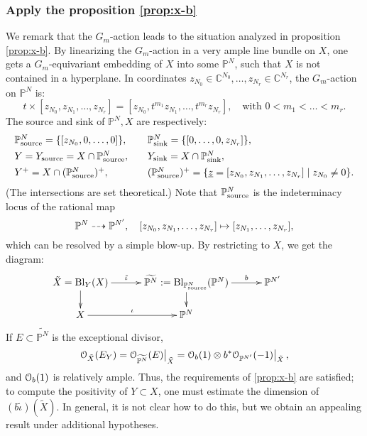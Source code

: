 \documentclass[11pt,reqno]{amsart}
\let\mt\mapsto
\let\euf\EuScript
\let\mbb\mathbb
\let\unl\underline
\let\tld\tilde
\let\wtld\widetilde
\numberwithin{equation}{section}
\numberwithin{figure}{section}
\begin{document}
\subsubsection{Apply the proposition \ref{prop:x-b}}\label{sssct:x-b}
We remark that the $G_m$-action leads to the situation analyzed 
in proposition \ref{prop:x-b}. By linearizing the $G_m$-action in a very ample 
line bundle on $X$, one gets a $G_m$-equivariant embedding of $X$ into some 
$\mbb P^N$, such that $X$ is not contained in a hyperplane. 
In coordinates $z_{N_0}\in{{\mbb C}}^{N_0},\ldots,z_{N_r}\in{{\mbb C}}^{N_r}$, 
the $G_m$-action on $\mbb P^N$ is: 
\begin{equation}\label{eq:c*}
t\times[z_{N_0},z_{N_1},\ldots,z_{N_r}]=
[z_{N_0},t^{m_1}z_{N_1},\ldots,t^{m_r}z_{N_r}],
\quad\text{with }0<m_1<\ldots<m_r. 
\end{equation}
The source and sink of $\mbb P^N, X$ are respectively: 
\begin{equation}\label{eq:YP}
\begin{array}{lcll}
\mbb P^N_{\rm source}=\{[z_{N_0},0,\ldots,0]\}, 
&&
\mbb P^N_{\rm sink}=\{[0,\ldots,0,z_{N_r}]\},
\\[1ex] 
Y=Y_{\rm source}=X\cap \mbb P^N_{\rm source},
&& 
Y_{\rm sink}=X\cap \mbb P^N_{\rm sink},
\\[1ex]
Y^+=X\cap (\mbb P^N_{\rm source})^+,
&&
(\mbb P^N_{\rm source})^+
=\{{{\unl z}}=[z_{N_0},z_{N_1},\ldots,z_{N_r}]\mid z_{N_0}\neq 0\}.
\end{array}
\end{equation}
(The intersections are set theoretical.) 
Note that $\mbb P^N_{\rm source}$ is the indeterminacy locus of  the rational map 
$$
\mbb P^N\dashto\mbb P^{N'},\quad
[z_{N_0},z_{N_1},\ldots,z_{N_r}]\mt[z_{N_1},\ldots,z_{N_r}],
$$
which can be resolved by a simple blow-up. 
By restricting to $X$, we get the diagram:
\begin{equation}\label{eq:y-source}
\xymatrix@R=1.5em@C=3em{
\tld X={{\rm Bl}}_{Y}(X)\ar[d]\ar[r]^-{\tld\iota}&
\wtld{\mbb P^N}:={{\rm Bl}}_{\mbb P^N_{\rm source}}(\mbb P^N)\ar[d]\ar[r]^-b&
\mbb P^{N'}
\\ 
X\ar[r]^-\iota&\mbb P^N&&
}
\end{equation}
If $E\subset\wtld{\mbb P^N}$ is the exceptional divisor, 
$$
{{\euf O}}_{\tld X}(E_Y)={{{\euf O}}_{\wtld{\mbb  P^N}}(E)\big|}_{\tld X}
={{{\euf O}}_b(1)\otimes b^*{{\euf O}}_{\mbb P^{N'}}(-1)\big|}_{\tld X}\,,
$$ 
and ${{\euf O}}_b(1)$ is relatively ample. 
Thus, the requirements of \ref{prop:x-b} are satisfied; to compute the positivity 
of $Y\subset X$, one must estimate the dimension of $(b\tld\iota)(\tld X)$. 
In general, it is not clear how to do this, but we obtain an appealing result under 
additional hypotheses.
\end{document}
